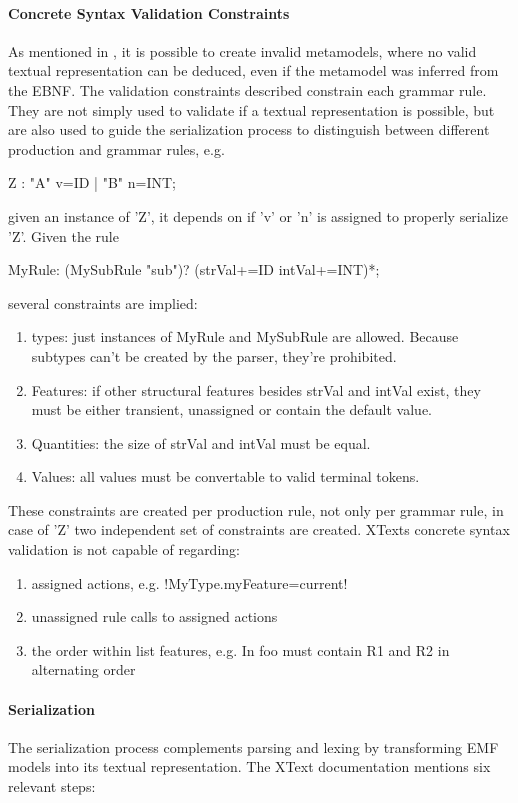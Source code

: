 \paragraph{Concrete Syntax Validation Constraints}
As mentioned in \cite{MofCfg}, it is possible to create invalid metamodels, where no valid textual representation can be deduced, even if the metamodel was inferred from the EBNF. The validation constraints described constrain each grammar rule. They are not simply used to validate if a textual representation is possible, but are also used to guide the serialization process to distinguish between different production and grammar rules, e.g.
\begin{xtxt}
Z 	:  "A" v=ID  
	|  "B" n=INT;
\end{xtxt}
given an instance of 'Z', it depends on if 'v' or 'n' is assigned to properly serialize 'Z'.
Given the rule
\begin{xtxt}
MyRule:	({MySubRule} "sub")? (strVal+=ID intVal+=INT)*;
\end{xtxt}
several constraints are implied:
\begin{enumerate}
	\item types: just instances of MyRule and MySubRule are allowed. Because subtypes can't be created by the parser, they're prohibited. 
	\item Features: if other structural features besides strVal and intVal exist, they must be either transient, unassigned or contain the default value.
	\item Quantities: the size of strVal and intVal must be equal.
	\item Values: all values must be convertable to valid terminal tokens.
\end{enumerate}
These constraints are created per production rule, not only per grammar rule, in case of 'Z' two independent set of constraints are created.
XTexts concrete syntax validation is not capable of regarding:
\begin{enumerate}
	\item assigned actions, e.g. 
	\kode!{MyType.myFeature=current}!
	\item unassigned rule calls to assigned actions
	\item the order within list features, e.g. In  foo must contain R1 and R2 in alternating order
\end{enumerate}

\paragraph{Serialization}
The serialization process complements parsing and lexing by transforming EMF models into its textual representation. The XText documentation mentions six relevant steps:

